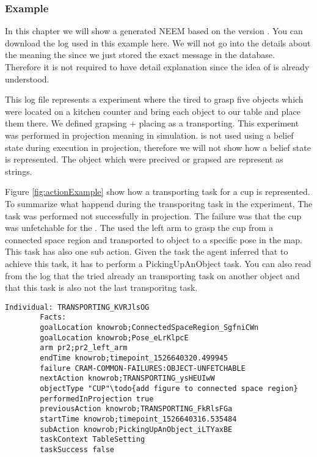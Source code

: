 \subsubsection{Example}
	\label{ch:example}
	In this chapter we will show a generated NEEM based on the version \neemversion.
	You can download the log used in this example here.	
	We will not go into the details about the \neemexp meaning the \tf since we just stored the exact \tf message in the database.
	Therefore it is not required to have detail explanation since the idea of \tf is already understood.
	
	This log file represents a experiment where the \pr tired to grasp five objects which were located on a kitchen counter and bring each object to our table and place them there.
	We defined grapsing + placing as a transporting.
	This experiment was performed in projection meaning in simulation.
	\cram is not used using a belief state during execution in projection, therefore we will not show how a belief state is represented.
	The object which were precived or grapsed are represent as strings.
	
	Figure \ref{fig:actionExample} show how a transporting task for a cup is represented.
	To summarize what happend during the transporitng task in the experiment,
	The task was performed not successfully in projection. 
	The failure was that the cup was unfetchable for the \pr.
	The \pr used the left arm to grasp the cup from a connected space region and transported to object to a specific pose in the map.
	This task has also one sub action. 
	Given the task the agent inferred that to achieve this task, it has to perform a PickingUpAnObject task.
	You can also read from the log that the  tried already an transporting task on another object and that this task is also not the last transporitng task.
	
	\begin{minipage}{\textwidth}
		\scriptsize
		\begin{lstlisting}[frame=single]
		Individual: TRANSPORTING_KVRJlsOG
		Facts: 
		goalLocation knowrob;ConnectedSpaceRegion_SgfniCWn
		goalLocation knowrob;Pose_eLrKlpcE
		arm pr2;pr2_left_arm
		endTime knowrob;timepoint_1526640320.499945
		failure CRAM-COMMON-FAILURES:OBJECT-UNFETCHABLE
		nextAction knowrob;TRANSPORTING_ysHEUIwW
		objectType "CUP"\todo{add figure to connected space region}
		performedInProjection true
		previousAction knowrob;TRANSPORTING_FkRlsFGa
		startTime knowrob;timepoint_1526640316.535484
		subAction knowrob;PickingUpAnObject_iLTYaxBE
		taskContext TableSetting
		taskSuccess false
		\end{lstlisting}

		\label{fig:actionExample}
	\end{minipage}
			\vspace{0.5mm}	
	

